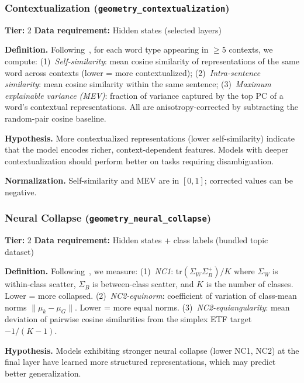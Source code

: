 \documentclass{article}
\begin{document}
\subsubsection{Contextualization (\texttt{geometry\_contextualization})}
\label{app:contextualization}

\textbf{Tier:} 2 \quad \textbf{Data requirement:} Hidden states (selected layers)

\textbf{Definition.}
Following~\citet{ethayarajh2019contextual}, for each word type appearing in $\geq 5$ contexts, we compute:
(1)~\emph{Self-similarity}: mean cosine similarity of representations of the same word across contexts (lower = more contextualized);
(2)~\emph{Intra-sentence similarity}: mean cosine similarity within the same sentence;
(3)~\emph{Maximum explainable variance (MEV)}: fraction of variance captured by the top PC of a word's contextual representations.
All are anisotropy-corrected by subtracting the random-pair cosine baseline.

\textbf{Hypothesis.} More contextualized representations (lower self-similarity) indicate that the model encodes richer, context-dependent features. Models with deeper contextualization should perform better on tasks requiring disambiguation.

\textbf{Normalization.} Self-similarity and MEV are in $[0,1]$; corrected values can be negative.

\subsubsection{Neural Collapse (\texttt{geometry\_neural\_collapse})}
\label{app:neural-collapse}

\textbf{Tier:} 2 \quad \textbf{Data requirement:} Hidden states + class labels (bundled topic dataset)

\textbf{Definition.}
Following~\citet{papyan2020prevalence}, we measure:
(1)~\emph{NC1}: $\text{tr}(\Sigma_W \Sigma_B^+) / K$ where $\Sigma_W$ is within-class scatter, $\Sigma_B$ is between-class scatter, and $K$ is the number of classes. Lower = more collapsed.
(2)~\emph{NC2-equinorm}: coefficient of variation of class-mean norms $\|\mu_k - \mu_G\|$. Lower = more equal norms.
(3)~\emph{NC2-equiangularity}: mean deviation of pairwise cosine similarities from the simplex ETF target $-1/(K-1)$.

\textbf{Hypothesis.} Models exhibiting stronger neural collapse (lower NC1, NC2) at the final layer have learned more structured representations, which may predict better generalization.
\end{document}
